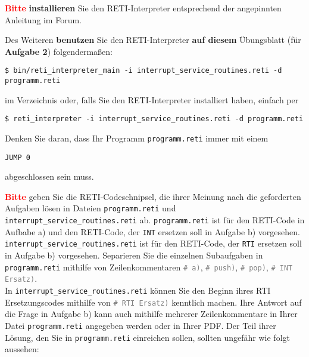\documentclass{article}
\newenvironment{adjustedminipage}[1]
  {\vspace{0.15cm}\begin{minipage}{#1}}
  {\end{minipage}}
\begin{document}
{\LARGE \textbf{\textcolor{red}{Bitte}}} \textbf{installieren} Sie den RETI-Interpreter entsprechend der angepinnten Anleitung im Forum.

Des Weiteren \textbf{benutzen} Sie den RETI-Interpreter \textbf{auf diesem} Übungsblatt (für \textbf{Aufgabe 2}) folgendermaßen:

\begin{center}
	\begin{adjustedminipage}{0.9\textwidth}
		\begin{verbatim}
$ bin/reti_interpreter_main -i interrupt_service_routines.reti -d programm.reti
    \end{verbatim}
	\end{adjustedminipage}
\end{center}

	im Verzeichnis oder, falls Sie den RETI-Interpreter installiert haben, einfach per

\begin{center}
	\begin{adjustedminipage}{0.9\textwidth}
		\begin{verbatim}
$ reti_interpreter -i interrupt_service_routines.reti -d programm.reti
    \end{verbatim}
	\end{adjustedminipage}
\end{center}

Denken Sie daran, dass Ihr Programm \verb|programm.reti| immer mit einem

\begin{center}
	\begin{adjustedminipage}{0.9\textwidth}
		\begin{verbatim}
JUMP 0
    \end{verbatim}
	\end{adjustedminipage}
\end{center}

abgeschlossen sein muss.

{\LARGE \textbf{\textcolor{red}{Bitte}}} geben Sie die RETI-Codeschnipsel, die ihrer Meinung nach die geforderten Aufgaben lösen in Dateien \verb|programm.reti| und \verb|interrupt_service_routines.reti| ab. \verb|programm.reti| ist für den RETI-Code in Aufbabe a) und den RETI-Code, der \verb|INT| ersetzen soll in Aufgabe b) vorgesehen. \verb|interrupt_service_routines.reti| ist für den RETI-Code, der \verb|RTI| ersetzen soll in Aufgabe b) vorgesehen. Separieren Sie die einzelnen Subaufgaben in \verb|programm.reti| mithilfe von Zeilenkommentaren \textcolor{gray}{\texttt{\# a)}}, \textcolor{gray}{\texttt{\# push)}}, \textcolor{gray}{\texttt{\# pop)}}, \textcolor{gray}{\texttt{\# INT Ersatz)}}.\\
In \verb|interrupt_service_routines.reti| können Sie den Beginn ihres RTI Ersetzungscodes mithilfe von \textcolor{gray}{\texttt{\# RTI Ersatz)}} kenntlich machen. Ihre Antwort auf die Frage in Aufgabe b) kann auch mithilfe mehrerer Zeilenkommentare in Ihrer Datei \verb|programm.reti| angegeben werden oder in Ihrer PDF. Der Teil ihrer Lösung, den Sie in \verb|programm.reti| einreichen sollen, sollten ungefähr wie folgt aussehen:
\end{document}

